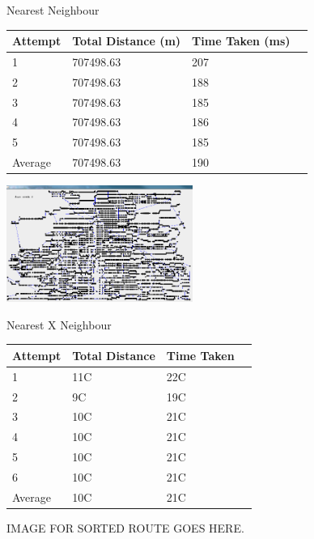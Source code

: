 \documentclass[conference,backref=page]{acmsiggraph}
\begin{document}
\begin{center}	
	
		Nearest Neighbour

	\begin{tabular}{| l | l | l | l |}
		\hline
		Attempt & Total Distance (m) & Time Taken (ms)\\ \hline
		1 & 707498.63 & 207 \\ \hline
		2 & 707498.63 & 188  \\ \hline
		3 & 707498.63 & 185 \\ \hline
		4 & 707498.63 & 186 \\ \hline
		5 & 707498.63 & 185 \\ \hline
		Average & 707498.63 & 190 \\ \hline
	\end{tabular}
	
   \includegraphics[height=1.5in]{images/rl5915nn}
\end{center}


\begin{center}	
	
	Nearest X Neighbour
	
	\begin{tabular}{| l | l | l | l |}
		\hline
		Attempt & Total Distance & Time Taken\\ \hline
		1 & 11C & 22C \\ \hline
		2 & 9C & 19C  \\ \hline
		3 & 10C & 21C \\ \hline
		4 & 10C & 21C \\ \hline
		5 & 10C & 21C \\ \hline
		6 & 10C & 21C \\ \hline
		Average & 10C & 21C \\ \hline	
	\end{tabular}
	
	IMAGE FOR SORTED ROUTE GOES HERE.
\end{center}
\end{document}
